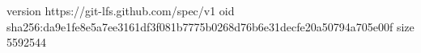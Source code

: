 version https://git-lfs.github.com/spec/v1
oid sha256:da9e1fe8e5a7ee3161df3f081b7775b0268d76b6e31decfe20a50794a705e00f
size 5592544

